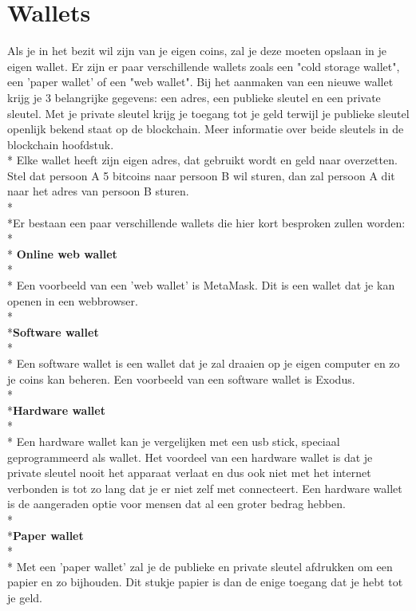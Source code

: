 \documentclass[fleqn,a4paper,12pt]{book}
\begin{document}
\section{Wallets}
Als je in het bezit wil zijn van je eigen coins, zal je deze moeten opslaan in je eigen wallet. Er zijn er paar verschillende wallets zoals een "cold storage wallet", een 'paper wallet' of een "web wallet". Bij het aanmaken van een nieuwe wallet krijg je 3 belangrijke gegevens: een adres, een publieke sleutel en een private sleutel. Met je private sleutel krijg je toegang tot je geld terwijl je publieke sleutel openlijk bekend staat op de blockchain. Meer informatie over beide sleutels in de blockchain hoofdstuk.\\* Elke wallet heeft zijn eigen adres, dat gebruikt wordt en geld naar overzetten. Stel dat persoon A 5 bitcoins naar persoon B wil sturen, dan zal persoon A dit naar het adres van persoon B sturen.\\*\\*Er bestaan een paar verschillende wallets die hier kort besproken zullen worden:\\*\\*
\textbf{Online web wallet}\\*\\*
Een voorbeeld van een 'web wallet' is MetaMask. Dit is een wallet dat je kan openen in een webbrowser.
\\*\\*\textbf{Software wallet}\\*\\*
Een software wallet is een wallet dat je zal draaien op je eigen computer en zo je coins kan beheren. Een voorbeeld van een software wallet is Exodus.
\\*\\*\textbf{Hardware wallet}\\*\\*
Een hardware wallet kan je vergelijken met een usb stick, speciaal geprogrammeerd als wallet. Het voordeel van een hardware wallet is dat je private sleutel nooit het apparaat verlaat en dus ook niet met het internet verbonden is tot zo lang dat je er niet zelf met connecteert. Een hardware wallet is de aangeraden optie voor mensen dat al een groter bedrag hebben.
\\*\\*\textbf{Paper wallet}\\*\\*
Met een 'paper wallet' zal je de publieke en private sleutel afdrukken om een papier en zo bijhouden. Dit stukje papier is dan de enige toegang dat je hebt tot je geld.
~\autocite{wallet1}
\end{document}
